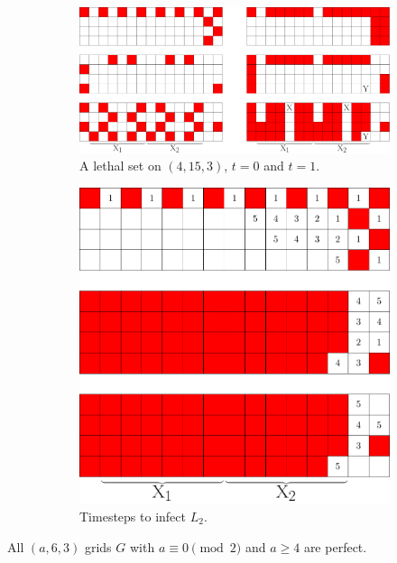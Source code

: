 \begin{figure}[]
\centering
\begin{subfigure}{0.65\textwidth}
\includegraphics[width=\textwidth]{figures/7/4x15x3.pdf}
\caption{A lethal set on $(4,15,3)$, $t=0$ and $t=1$.}
\label{fig:4x15x3}
\end{subfigure} \hfill%
\begin{subfigure}{0.3\textwidth}
\includegraphics[width=\textwidth]{figures/7/4x15x3_timesteps_numbered_heatmap.pdf}
\caption{Timesteps to infect $L_2$.}
\label{fig:4x15x3_timesteps}
\end{subfigure}
\caption{}
\label{fig:}
\end{figure} 

\begin{con}
\label{con:3x6xeven}
All $(a,6,3)$ grids $G$ with $a \equiv 0 \pmod 2$ and $a \geq 4$ are perfect. 
\end{con}

